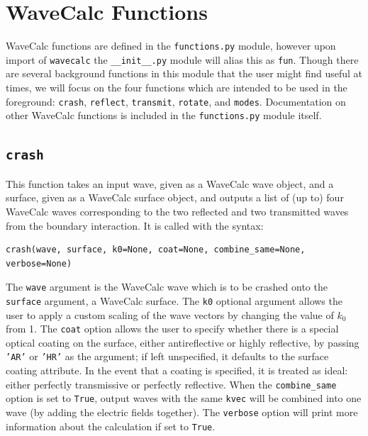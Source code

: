 \documentclass[11pt, reqno]{book}%
\newcounter{ct}
\newcommand{\tw}[1]{{\tt #1}}
\begin{document}

\chapter{WaveCalc Functions}
\label{chap:wavecalcfun}

WaveCalc functions are defined in the \tw{functions.py} module, however upon import of \tw{wavecalc} the \tw{\_\_init\_\_.py} module will alias this as \tw{fun}. Though there are several background functions in this module that the user might find useful at times, we will focus on the four functions which are intended to be used in the foreground: \tw{crash}, \tw{reflect}, \tw{transmit}, \tw{rotate}, and \tw{modes}. Documentation on other WaveCalc functions is included in the \tw{functions.py} module itself.



\section{\tw{crash}}
\label{sec:crash}

This function takes an input wave, given as a WaveCalc wave object, and a surface, given as a WaveCalc surface object, and outputs a list of (up to) four WaveCalc waves corresponding to the two reflected and two transmitted waves from the boundary interaction. It is called with the syntax:
\begin{verbatim}
crash(wave, surface, k0=None, coat=None, combine_same=None, verbose=None)
\end{verbatim}
\noindent The \tw{wave} argument is the WaveCalc wave which is to be crashed onto the \tw{surface} argument, a WaveCalc surface. The \tw{k0} optional argument allows the user to apply a custom scaling of the wave vectors by changing the value of $k_0$ from 1. The \tw{coat} option allows the user to specify whether there is a special optical coating on the surface, either antireflective or highly reflective, by passing \tw{'AR'} or \tw{'HR'} as the argument; if left unspecified, it defaults to the surface coating attribute. In the event that a coating is specified, it is treated as ideal: either perfectly transmissive or perfectly reflective. When the \tw{combine\_same} option is set to \tw{True}, output waves with the same \tw{kvec} will be combined into one wave (by adding the electric fields together). The \tw{verbose} option will print more information about the calculation if set to \tw{True}.
\end{document}
